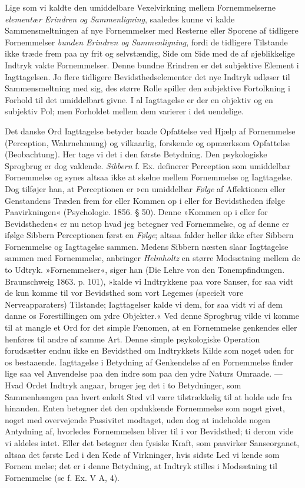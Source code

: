 \documentclass[12pt,a4paper,openany]{book}
\newcommand{\opage}[1]{\marginnote{\footnotesize\textit{[#1]}}}
\begin{document}
Lige som vi kaldte den umiddelbare Vexelvirkning mellem Fornemmelserne
\emph{elementær Erindren og Sammenligning}, saaledes kunne vi kalde
Sammensmeltningen af nye Fornemmelser med Resterne eller Sporene af
tidligere Fornemmelser \emph{bunden Erindren og Sammenligning}, fordi de
tidligere Tilstande ikke træde frem paa ny frit og selvstændig, Side om
Side med de af øjeblikkelige Indtryk vakte Fornemmelser. Denne bundne
Erindren er det subjektive Element i Iagttagelsen. Jo flere tidligere
Bevidsthedselementer det nye Indtryk udløser til Sammensmeltning med
sig, des større Rolle spiller den subjektive Fortolkning i Forhold til
det umiddelbart givne. I al Iagttagelse er der en objektiv og en
subjektiv Pol; men Forholdet mellem dem varierer i det uendelige.


\opage{154}Det danske Ord Iagttagelse betyder baade Opfattelse ved Hjælp
af Fornemmelse (Perception, Wahrnehmung) og vilkaarlig, forskende og
opmærksom Opfattelse (Beobachtung). Her tage vi det i den første
Betydning. Den psykologiske Sprogbrug er dog vaklende. \emph{Sibbern} f.
Ex. definerer Perception som umiddelbar Fornemmelse og synes altsaa ikke
at skelne mellem Fornemmelse og Iagttagelse. Dog tilføjer han, at
Perceptionen er »en umiddelbar \emph{Følge} af Affektionen eller
Genstandens Træden frem for eller Kommen op i eller for Bevidstheden
ifølge Paavirkningen« (Psychologie. 1856. § 50). Denne »Kommen op i
eller for Bevidstheden« er nu netop hvad jeg betegner ved Fornemmelse,
og af denne er ifølge Sibbern Perceptionen først en \emph{Følge}; altsaa
falder heller ikke efter Sibbern Fornemmelse og Iagttagelse sammen.
Medens Sibbern næsten slaar Iagttagelse sammen med Fornemmelse,
anbringer \emph{Helmholtz} en større Modsætning mellem de to Udtryk.
»Fornemmelser«, siger han (Die Lehre von den Tonempfindungen.
Braunschweig 1863. p. 101), »kalde vi Indtrykkene paa vore Sanser, for
saa vidt de kun komme til vor Bevidsthed som vort Legemes (specielt vore
Nerveapparaters) Tilstande; Iagttagelser kalde vi dem, for saa vidt vi
af dem danne os Forestillingen om ydre Objekter.« Ved denne Sprogbrug
vilde vi komme til at mangle et Ord for det simple Fænomen, at en
Fornemmelse genkendes eller henføres til andre af samme Art. Denne
simple psykologiske Operation forudsætter endnu ikke en Bevidsthed om
Indtrykkets Kilde som noget uden for os bestaaende. Iagttagelse i
Betydning af Genkendelse af en Fornemmelse finder lige saa vel
Anvendelse paa den indre som paa den ydre Naturs Omraade. --- Hvad Ordet
Indtryk angaar, bruger jeg det i to Betydninger, som Sammenhængen paa
hvert enkelt Sted vil være tilstrækkelig til at holde ude fra hinanden.
Enten betegner det den opdukkende Fornemmelse som noget givet, noget med
overvejende Passivitet modtaget, uden dog at indeholde nogen Antydning
af, hvorledes Fornemmelsen bliver til i vor Bevidsthed; ti derom vide vi
aldeles intet. Eller det betegner den fysiske Kraft, som paavirker
Sanseorganet, altsaa det første Led i den Kede af Virkninger, hvis
sidste Led vi kende som Fornem%
\opage{155}melse; det er i denne Betydning, at Indtryk stilles i
Modsætning til Fornemmelse (se f. Ex. V A, 4).
\end{document}
